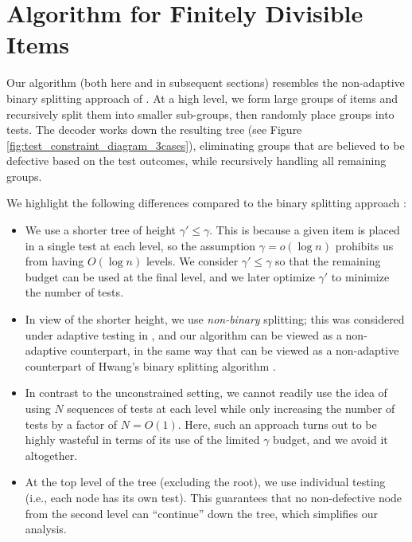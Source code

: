 
\section{Algorithm for Finitely Divisible Items}

Our algorithm (both here and in subsequent sections) resembles the non-adaptive binary splitting approach of \cite{cher20,Eri20}.  At a high level, we form large groups of items and recursively split them into smaller sub-groups, then randomly place groups into tests.  The decoder works down the resulting tree (see Figure \ref{fig:test_constraint_diagram_3cases}), eliminating groups that are believed to be defective based on the test outcomes, while recursively handling all remaining groups.

We highlight the following differences compared to the binary splitting approach \cite{cher20,Eri20}:
\begin{itemize}
    \item We use a shorter tree of height $\gamma'\leq\gamma$.  This is because a given item is placed in a single test at each level, so the assumption $\gamma = o(\log n)$ prohibits us from having $O(\log n)$ levels.  We consider $\gamma' \le \gamma$ so that the remaining budget can be used at the final level, and we later optimize $\gamma'$ to minimize the number of tests.
    \item In view of the shorter height, we use {\em non-binary} splitting; this was considered under adaptive testing in \cite{Nel20,Oli20}, and our algorithm can be viewed as a non-adaptive counterpart, in the same way that \cite{cher20,Eri20} can be viewed as a non-adaptive counterpart of Hwang's binary splitting algorithm \cite{Hwa72}.
    \item In contrast to the unconstrained setting, we cannot readily use the idea of using $N$ sequences of tests at each level while only increasing the number of tests by a factor of $N = O(1)$.  Here, such an approach turns out to be highly wasteful in terms of its use of the limited $\gamma$ budget, and we avoid it altogether.
    \item At the top level of the tree (excluding the root), we use individual testing (i.e., each node has its own test). This guarantees that no non-defective node from the second level can ``continue'' down the tree, which simplifies our analysis.
\end{itemize}


